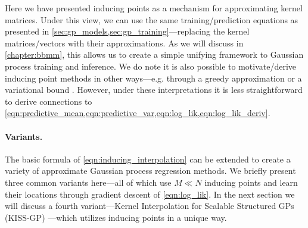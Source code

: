 Here we have presented inducing points as a mechanism for approximating kernel matrices.
Under this view, we can use the same training/prediction equations as presented in \cref{sec:gp_models,sec:gp_training}---replacing the kernel matrices/vectors with their approximations.
As we will discuss in \cref{chapter:bbmm}, this allows us to create a simple unifying framework to Gaussian process training and inference.
We do note it is also possible to motivate/derive inducing point methods in other ways---e.g. through a greedy approximation \cite{smola2001sparse} or a variational bound \cite{titsias2009variational,hensman2013gaussian}.
However, under these interpretations it is less straightforward to derive connections to \cref{eqn:predictive_mean,eqn:predictive_var,eqn:log_lik,eqn:log_lik_deriv}.

\paragraph{Variants.}
The basic formula of \cref{eqn:inducing_interpolation} can be extended to create a variety of approximate Gaussian process regression methods.
We briefly present three common variants here---all of which use $M \ll N$ inducing points and learn their locations through gradient descent of \cref{eqn:log_lik}.
In the next section we will discuss a fourth variant---Kernel Interpolation for Scalable Structured GPs (KISS-GP) \cite{wilson2015kernel}---which utilizes inducing points in a unique way.

